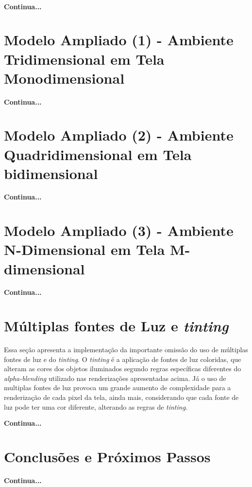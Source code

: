\documentclass{article}
\begin{document}
	\paragraph{}
	\textbf{Continua...}

	\section{Modelo Ampliado (1) - Ambiente Tridimensional em Tela Monodimensional}
	
	\paragraph{}
	\textbf{Continua...}
	
	\section{Modelo Ampliado (2) - Ambiente Quadridimensional em Tela bidimensional}
	
	\paragraph{}
	\textbf{Continua...}
	
	\section{Modelo Ampliado (3) - Ambiente N-Dimensional em Tela M-dimensional}
	
	\paragraph{}
	\textbf{Continua...}
	
	\section{Múltiplas fontes de Luz e \textit{tinting}}
	
	\paragraph{}
	Essa seção apresenta a implementação da importante omissão do uso de múltiplas fontes de luz e do \textit{tinting}. O \textit{tinting} é a aplicação de fontes de luz coloridas, que alteram as cores dos objetos iluminados segundo regras específicas diferentes do \textit{alpha-blending} utilizado nas renderizações apresentadas acima. Já o uso de multiplas fontes de luz provoca um grande aumento de complexidade para a renderização de cada pixel da tela, ainda mais, considerando que cada fonte de luz pode ter uma cor diferente, alterando as regras de \textit{tinting}.
	
	\textbf{Continua...}
	
	\section{Conclusões e Próximos Passos}
	
	\paragraph{}
	\textbf{Continua...}

	
\end{document}
